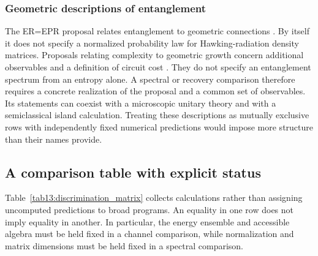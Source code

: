 \documentclass[11pt,letterpaper]{article}
\theoremstyle{plain}
\theoremstyle{definition}
\theoremstyle{remark}
\begin{document}
\subsubsection{Geometric descriptions of entanglement}
\label{subsec13:erepr}
The ER=EPR proposal relates entanglement to geometric connections
\cite{maldacenasusskind2013}. By itself it does not specify a normalized
probability law for Hawking-radiation density matrices. Proposals relating complexity to geometric growth concern additional
observables and a definition of circuit cost
\citep{stanfordsusskind2014}. They do not specify an entanglement
spectrum from an entropy alone. A spectral or
recovery comparison therefore requires a concrete realization of the
proposal and a common set of observables. Its statements can coexist
with a microscopic unitary theory and with a semiclassical island
calculation. Treating these descriptions as mutually exclusive rows
with independently fixed numerical predictions would impose more
structure than their names provide.

\subsection{A comparison table with explicit status}
\label{subsec13:discrimination_matrix}

Table~\ref{tab13:discrimination_matrix} collects calculations rather than assigning
uncomputed predictions to broad programs. An equality in one row does
not imply equality in another. In particular, the energy ensemble and
accessible algebra must be held fixed in a channel comparison, while
normalization and matrix dimensions must be held fixed in a spectral
comparison.
\end{document}

